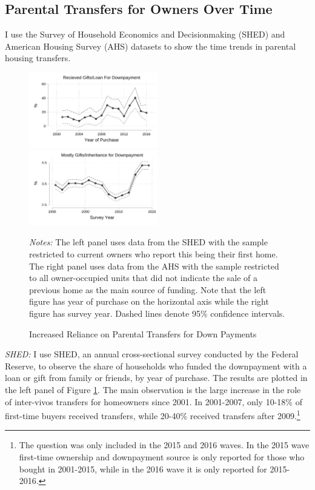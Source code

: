 \documentclass[12pt]{article}
\begin{document}
\subsection{Parental Transfers for Owners Over Time}\label{sec:overtime}
I use the Survey of Household Economics and Decisionmaking (SHED) and American Housing Survey (AHS) datasets to show the time trends in parental housing transfers.


\begin{figure}
	\caption{Increased Reliance on Parental Transfers for Down Payments}\label{fig:motivation}
	\includegraphics[width=0.5\textwidth]{../tabfig/descr/SHED_gift_scatter_SE_paper}%
	\includegraphics[width=0.5\textwidth]{../tabfig/descr/AHS_majorsourcedown_surveyyear_paper}%
	
	 {\begin{footnotesize} \textit{Notes:} The left panel uses data from the SHED with the sample restricted to current owners who report this being their first home. The right panel uses data from the AHS with the sample restricted to all owner-occupied units that did not indicate the sale of a previous home as the main source of funding. Note that the left figure has year of purchase on the horizontal axis while the right figure has survey year. Dashed lines denote 95\% confidence intervals.\end{footnotesize}}
\end{figure}

\textit{SHED:} I use SHED, an annual cross-sectional survey conducted by the Federal Reserve,  to observe the share of households who funded the downpayment with a loan or gift from family or friends, by year of purchase. The results are plotted in the left panel of Figure \ref{fig:motivation}. The main observation is the large increase in the role of inter-vivos transfers for homeowners since 2001. In 2001-2007, only 10-18\% of first-time buyers received transfers, while 20-40\% received transfers after 2009.\footnote{The question was only included in the 2015 and 2016 waves. In the 2015 wave first-time ownership and downpayment source is only reported for those who bought in 2001-2015, while in the 2016 wave it is only reported for 2015-2016. } 
\end{document}
